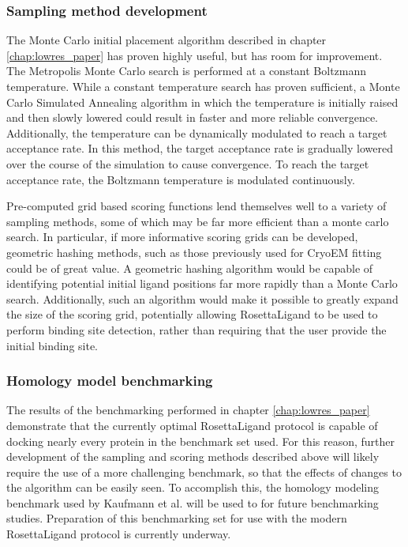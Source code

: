 \subsubsection{Sampling method development}
The Monte Carlo initial placement algorithm described in chapter \ref{chap:lowres_paper} has proven highly useful, but has room for improvement.
The Metropolis Monte Carlo search is performed at a constant Boltzmann temperature.
While a constant temperature search has proven sufficient, a Monte Carlo Simulated Annealing algorithm in which the temperature is initially raised and then slowly lowered could result in faster and more reliable convergence. 
Additionally, the temperature can be dynamically modulated to reach a target acceptance rate.
In this method, the target acceptance rate is gradually lowered over the course of the simulation to cause convergence.
To reach the target acceptance rate, the Boltzmann temperature is modulated continuously.

Pre-computed grid based scoring functions lend themselves well to a variety of sampling methods, some of which may be far more efficient than a monte carlo search.
In particular, if more informative scoring grids can be developed, geometric hashing methods, such as those previously used for CryoEM fitting\citep{Woetzel:2011id} could be of great value.
A geometric hashing algorithm would be capable of identifying potential initial ligand positions far more rapidly than a Monte Carlo search.
Additionally, such an algorithm would make it possible to greatly expand the size of the scoring grid, potentially allowing RosettaLigand to be used to perform binding site detection, rather than requiring that the user provide the initial binding site. 

\subsubsection{Homology model benchmarking}

The results of the benchmarking performed in chapter \ref{chap:lowres_paper} demonstrate that the currently optimal RosettaLigand protocol is capable of docking nearly every protein in the benchmark set used.
For this reason, further development of the sampling and scoring methods described above will likely require the use of a more challenging benchmark, so that the effects of changes to the algorithm can be easily seen. 
To accomplish this, the homology modeling benchmark used by Kaufmann et al.\citep{Kaufmann:2012ck} will be used to for future benchmarking studies.
Preparation of this benchmarking set for use with the modern RosettaLigand protocol is currently underway.

